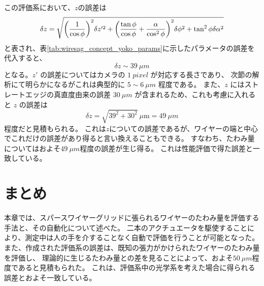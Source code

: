\documentclass[../../main.tex]{subfiles}
\begin{document}
この評価系において、$z$の誤差は
\begin{align}
    \delta z = \sqrt{\qty(\dfrac{1}{\cos\phi})^2\delta z'^2 + \qty(\dfrac{\tan\phi}{\cos\phi}+\dfrac{\alpha}{\cos^2\phi})^2\delta\phi^2 + \tan^2\phi\delta\alpha^2}
\end{align}
と表され、表\ref{tab:wiresag_concept_yoko_params}に示したパラメータの誤差を代入すると、
\begin{equation}
    \delta z \sim \SI{39}{\mu m}
\end{equation}
となる。$z'$ の誤差についてはカメラの $\SI{1}{pixel}$ が対応する長さであり、
次節の解析にて明らかになるがこれは典型的に $5\sim\SI{6}{\mu m}$ 程度である。
また、$z$ にはストレートエッジの真直度由来の誤差 $\SI{30}{\mu m}$ が含まれるため、これも考慮に入れると $z$ の誤差は
\begin{equation}
    \delta z = \sqrt{39^2+30^2}\ \mu\mathrm{m} = \SI{49}{\mu m}
\end{equation}
程度だと見積もられる。
これは$z$についての誤差であるが、ワイヤーの端と中心でこれだけの誤差があり得ると言い換えることもできる。
すなわち、たわみ量についてはおよそ$\SI{49}{\mu m}$程度の誤差が生じ得る。
これは性能評価で得た誤差と一致している。


\section{まとめ}
本章では、スパースワイヤーグリッドに張られるワイヤーのたわみ量を評価する手法と、その自動化について述べた。
二本のアクチュエータを駆使することにより、測定中は人の手を介することなく自動で評価を行うことが可能となった。
また、作成された評価系の誤差は、既知の張力がかけられたワイヤーのたわみ量を評価し、
理論的に生じるたわみ量との差を見ることによって、およそ$\SI{50}{\mu m}$程度であると見積もられた。
これは、評価系中の光学系を考えた場合に得られる誤差とおよそ一致している。
\end{document}
